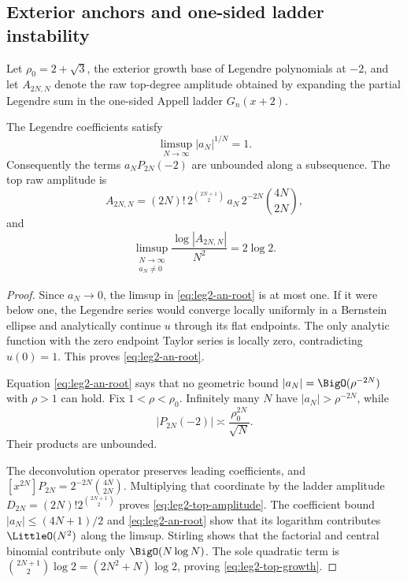 \subsection{Exterior anchors and one-sided ladder instability}

Let $\rho_0=2+\sqrt3$, the exterior growth base of Legendre polynomials at
$-2$, and let $A_{2N,N}$ denote the raw top-degree amplitude obtained by
expanding the partial Legendre sum in the one-sided Appell ladder
$G_n(x+2)$.

\begin{theorem}
\label{thm:leg2-exterior-top-growth}
The Legendre coefficients satisfy
\begin{equation}
 \limsup_{N\to\infty}|a_N|^{1/N}=1.
 \label{eq:leg2-an-root}
\end{equation}
Consequently the terms $a_NP_{2N}(-2)$ are unbounded along a subsequence.
The top raw
amplitude is
\begin{equation}
 A_{2N,N}=(2N)!\,2^{\binom{2N+1}{2}}\,
 a_N\,2^{-2N}\binom{4N}{2N},
 \label{eq:leg2-top-amplitude}
\end{equation}
and
\begin{equation}
 \boxed{\limsup_{\substack{N\to\infty\\a_N\ne0}}
 \frac{\log|A_{2N,N}|}{N^2}=2\log2.}
 \label{eq:leg2-top-growth}
\end{equation}
\end{theorem}

\begin{proof}
Since $a_N\to0$, the limsup in \eqref{eq:leg2-an-root} is at most one.  If it
were below one, the Legendre series would converge locally uniformly in a
Bernstein ellipse and analytically continue $u$ through its flat endpoints.
The only analytic function with the zero endpoint Taylor series is locally
zero, contradicting $u(0)=1$.  This proves \eqref{eq:leg2-an-root}.

Equation \eqref{eq:leg2-an-root} says that no geometric bound
$|a_N|=\BigO(\rho^{-2N})$ with $\rho>1$ can hold.  Fix
$1<\rho<\rho_0$.  Infinitely many $N$ have $|a_N|>\rho^{-2N}$, while
\[
 |P_{2N}(-2)|\asymp\frac{\rho_0^{2N}}{\sqrt N}.
\]
Their products are unbounded.

The deconvolution operator preserves leading coefficients, and
$[x^{2N}]P_{2N}=2^{-2N}\binom{4N}{2N}$.  Multiplying that coordinate by the
ladder amplitude $D_{2N}=(2N)!2^{\binom{2N+1}{2}}$ proves
\eqref{eq:leg2-top-amplitude}.  The coefficient bound
$|a_N|\le(4N+1)/2$ and \eqref{eq:leg2-an-root} show that its logarithm
contributes $\LittleO(N^2)$ along the limsup.  Stirling shows that the factorial and
central binomial contribute only $\BigO(N\log N)$.  The sole quadratic term is
$\binom{2N+1}{2}\log2=(2N^2+N)\log2$, proving
\eqref{eq:leg2-top-growth}.
\end{proof}

